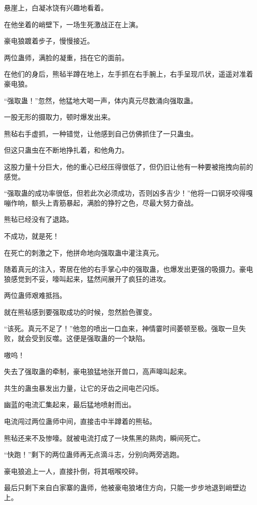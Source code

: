 
\begin{this_body}

悬崖上，白凝冰饶有兴趣地看着。

在他坐着的峭壁下，一场生死激战正在上演。

豪电狼踱着步子，慢慢接近。

两位蛊师，满脸的凝重，挡在它的面前。

在他们的身后，熊毡半蹲在地上，左手抓在右手腕上，右手呈现爪状，遥遥对准着豪电狼。

“强取蛊！”忽然，他猛地大喝一声，体内真元尽数涌向强取蛊。

一股无形的摄取力，顿时爆发出来。

熊毡右手虚抓，一种错觉，让他感到自己仿佛抓住了一只蛊虫。

但这只蛊虫在不断地挣扎着，和他角力。

这股力量十分巨大，他的重心已经压得很低了，但仍旧让他有一种要被拖拽向前的感觉。

“强取蛊的成功率很低，但若此次必须成功，否则凶多吉少！”他将一口钢牙咬得嘎嘣作响，额头上青筋暴起，满脸的狰狞之色，尽最大努力奋战。

熊毡已经没有了退路。

不成功，就是死！

在死亡的刺激之下，他拼命地向强取蛊中灌注真元。

随着真元的注入，寄居在他的右手掌心中的强取蛊，也爆发出更强的吸摄力。豪电狼感觉到不妥，嚎叫起来，猛然间展开了疯狂的进攻。

两位蛊师艰难抵挡。

就在熊毡感到要强取成功的时候，忽然脸色骤变。

“该死。真元不足了！”他忽的喷出一口血来，神情霎时间萎顿至极。强取一旦失败，就会受到反噬。这便是强取蛊的一个缺陷。

嗷呜！

失去了强取蛊的牵制，豪电狼猛地张开兽口，高声嗥叫起来。

共生的蛊虫暴发出力量，让它的牙齿之间电芒闪烁。

幽蓝的电流汇集起来，最后猛地喷射而出。

电流闯过两位蛊师中间，直接击中半蹲着的熊毡。

熊毡还来不及惨嚎。就被电流打成了一块焦黑的熟肉，瞬间死亡。

“快跑！”剩下的两位蛊师再无点滴斗志，分别向两旁逃跑。

豪电狼追上一人，直接扑倒，将其咽喉咬碎。

最后只剩下来自白家寨的蛊师，他被豪电狼堵住方向，只能一步步地退到峭壁边上。


\end{this_body}

